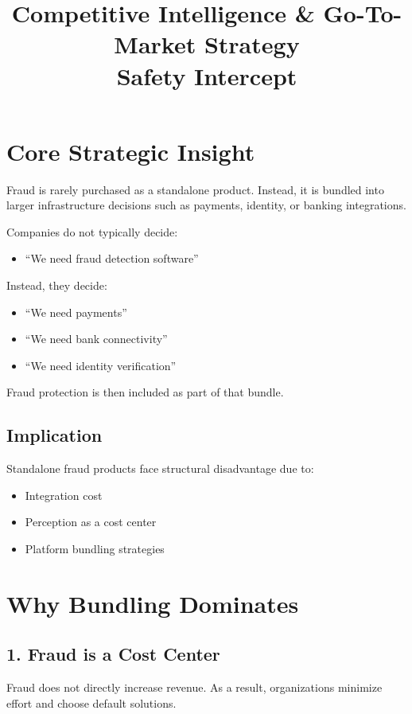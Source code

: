 \documentclass[11pt]{article}
\title{\textbf{Competitive Intelligence \& Go-To-Market Strategy}\\
Safety Intercept}
\author{}
\date{}
\begin{document}
\maketitle

\section{Core Strategic Insight}

Fraud is rarely purchased as a standalone product. Instead, it is bundled into larger infrastructure decisions such as payments, identity, or banking integrations.

Companies do not typically decide:
\begin{itemize}
    \item ``We need fraud detection software''
\end{itemize}

Instead, they decide:
\begin{itemize}
    \item ``We need payments''
    \item ``We need bank connectivity''
    \item ``We need identity verification''
\end{itemize}

Fraud protection is then included as part of that bundle.

\subsection{Implication}
Standalone fraud products face structural disadvantage due to:
\begin{itemize}
    \item Integration cost
    \item Perception as a cost center
    \item Platform bundling strategies
\end{itemize}

\section{Why Bundling Dominates}

\subsection{1. Fraud is a Cost Center}
Fraud does not directly increase revenue. As a result, organizations minimize effort and choose default solutions.
\end{document}

